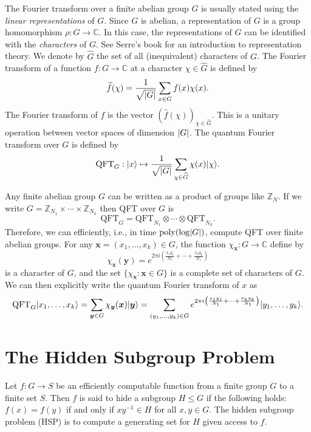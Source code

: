 \documentclass[11pt]{article}
\theoremstyle{plain}
\theoremstyle{definition}
\DeclareMathOperator{\poly}{poly}
\DeclarePairedDelimiter{\abs}{\lvert}{\rvert}
\DeclarePairedDelimiter{\ket}{\lvert}{\rangle}
\def\C{\mathbb{C}}
\def\Z{\mathbb{Z}}
\begin{document}
The Fourier transform over a finite abelian group $G$ is usually stated using the \textit{linear representations} of $G$. Since $G$ is abelian, a representation of $G$ is a group homomorphism $\rho: G \rightarrow \C$. In this case, the representations of $G$ can be identified with the \textit{characters} of $G$. See Serre's book \cite{serre1977linear} for an introduction to representation theory. We denote by $\widehat{G}$ the set of all (inequivalent) characters of $G$. The Fourier transform of a function $f: G \rightarrow \C$ at a character $\chi \in \widehat{G}$ is defined by
\[ \widehat{f}(\chi) = \frac{1}{\sqrt{\abs{G}}} \sum_{x \in G} f(x)\chi(x). \]
The Fourier transform of $f$ is the vector $(\widehat{f}(\chi))_{\chi \in \widehat{G}}$. This is a unitary operation between vector spaces of dimension $\abs{G}$. The quantum Fourier transform over $G$ is defined by
\[ \mathrm{QFT}_G: \ket{x} \mapsto \frac{1}{\sqrt{\abs{G}}} \sum_{\chi \in \widehat{G}} \chi(x) \ket{\chi}. \]

Any finite abelian group $G$ can be written as a product of groups like $\Z_N$. If we write $G = \Z_{N_1} \times \cdots \times \Z_{N_k}$ then QFT over $G$ is
\[ \mathrm{QFT}_G = \mathrm{QFT}_{N_1} \otimes \cdots \otimes \mathrm{QFT}_{N_k}.  \]
Therefore, we can efficiently, i.e., in time $\poly(\log \abs{G})$, compute QFT over finite abelian groups. For 
any $\bm{x} = (x_1, \dots, x_k) \in G$, the function $\chi_{\bm{x}}: G \rightarrow \C$ define by
\begin{equation}
\label{equ:char}
	\chi_{\bm{x}}(\bm{y}) = e^{2\pi i \left( \frac{x_1y_1}{N_1} + \cdots + \frac{x_ky_k}{N_1} 
	\right)}
\end{equation}
is a character of $G$, and the set $\{ \chi_{\bm{x}}: \bm{x} \in G \}$ is a complete set of 
characters of $G$. We can then explicitly write the quantum Fourier transform of $x$ as
\[ \mathrm{QFT}_G \ket{x_1, \dots, x_k} = \sum_{\bm{y} \in G} \chi_{\bm{y}}(\bm{x}) \ket{\bm{y}} = 
\sum_{(y_1, \dots, y_k) \in G} e^{2\pi i \left( \frac{x_1y_1}{N_1} + \cdots + \frac{x_ky_k}{N_1} 
\right)} \ket{y_1, \dots, y_k}. \]



\section{The Hidden Subgroup Problem}

Let $f: G \rightarrow S$ be an efficiently computable function from a finite group $G$ to a finite 
set $S$. Then $f$ is said to hide a subgroup $H \le G$ if the following holds: $f(x) = f(y)$ if and 
only if $xy^{-1} \in H$ for all $x, y \in G$. The hidden subgroup problem (HSP) is to compute a 
generating set for $H$ given access to $f$.
\end{document}
